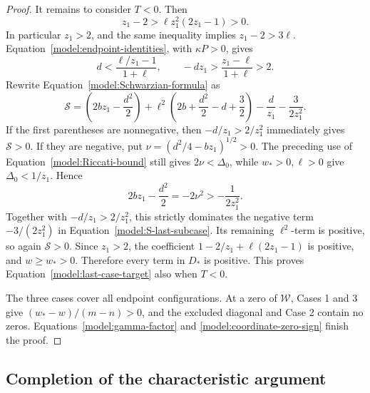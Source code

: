 \begin{proof}
It remains to consider \(T<0\).  Then
\[
 z_1-2>\ell z_1^2(2z_1-1)>0.
\]
In particular \(z_1>2\), and the same inequality implies \(z_1-2>3\ell\).
Equation~\eqref{model:endpoint-identities}, with \(\kappa P>0\), gives
\[
 d<\frac{\ell/z_1-1}{1+\ell},\qquad
 -dz_1>\frac{z_1-\ell}{1+\ell}>2.
\]
Rewrite Equation~\eqref{model:Schwarzian-formula} as
\begin{equation}
 \mathcal S=
 \left(2bz_1-\frac{d^2}{2}\right)
 +\ell^2\left(2b+\frac{d^2}{2}-d+\frac32\right)
 -\frac d{z_1}-\frac3{2z_1^2}.
 \label{model:S-last-subcase}
\end{equation}
If the first parentheses are nonnegative, then
\(-d/z_1>2/z_1^2\) immediately gives \(\mathcal S>0\).
If they are negative, put \(\nu=(d^2/4-bz_1)^{1/2}>0\).
The preceding use of Equation~\eqref{model:Riccati-bound} still gives
\(2\nu<\Delta_0\), while \(w_*>0,\ell>0\) give
\(\Delta_0<1/z_1\).  Hence
\[
 2bz_1-\frac{d^2}{2}=-2\nu^2>-\frac1{2z_1^2}.
\]
Together with \(-d/z_1>2/z_1^2\), this strictly dominates the negative
term \(-3/(2z_1^2)\) in Equation~\eqref{model:S-last-subcase}.
Its remaining \(\ell^2\)-term is positive, so again
\(\mathcal S>0\).
Since \(z_1>2\), the coefficient \(1-2/z_1+\ell(2z_1-1)\) is positive,
and \(w\ge w_*>0\).  Therefore every term in \(D_*\) is positive.
This proves Equation~\eqref{model:last-case-target} also when \(T<0\).

The three cases cover all endpoint configurations.
At a zero of \(\mathcal W\), Cases 1 and 3 give
\((w_*-w)/(m-n)>0\), and the excluded diagonal and Case 2 contain no
zeros.  Equations~\eqref{model:gamma-factor} and
\eqref{model:coordinate-zero-sign} finish the proof.
\end{proof}

\subsection{Completion of the characteristic argument}

